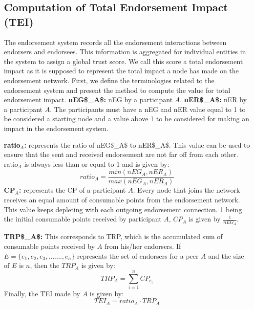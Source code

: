 \subsection{Computation of Total Endorsement Impact (TEI)} \label{computetei}
The endorsement system records all the endorsement interactions between
endorsers and endorsees. This information is aggregated for individual entities
in the system to assign a global trust score. We call this score a total
endorsement impact as it is supposed to represent the total impact a node has
made on the endorsement network. First, we define the terminologies related to
the endorsement system and present the method to compute the value for total
endorsement impact.\newline 
\textbf{{\acrshort{nEG$_A$:}}} \ac{nEG} by a participant $A$. \newline
\textbf{{\acrshort{nER$_A$:}}} \ac{nER} by a participant $A$. \newline
The participants must have a \ac{nEG} and \ac{nER} value equal to 1 to be
considered a starting node and a value above 1 to be considered for making an
impact in the endorsement system. \newline

\textbf{ratio$_A$:} represents the ratio of \acrshort{nEG$_A$} to
\acrshort{nER$_A$}. This value can be used to ensure that the sent and received
endorsement are not far off from each other. ratio$_{A}$ is always less than or
equal to 1 and is given by:   
\begin{equation}
	ratio_A = \frac{min(nEG_A, nER_A)}{max(nEG_A, nER_A)}
\end{equation}
\textbf{\acrshort{CP}$_A$:} represents the \ac{CP} of a participant $A$. Every
node that joins the network receives an equal amount of consumable points from
the endorsement network. This value keeps depleting with each outgoing
endorsement connection. 1 being the initial consumable points received by
participant $A$, $CP_{A}$ is given by $\frac{1}{nEG_A}$.\newline

\textbf{\acrshort{TRP$_A$}:} This corresponds to \ac{TRP}, which is the
accumulated sum of consumable points received by $A$ from his/her endorsers.
\newline
If $E = \{e_{1}, e_{2}, e_{3}, ......., e_{n}\}$ represents the set of
endorsers for a peer $A$ and the size of $E$ is $n$, then the $TRP_{A}$ is
given by:
\begin{equation}
	TRP_A = \sum_{i=1}^{n}CP_{e_{i}}
\end{equation}
Finally, the \ac{TEI} made by $A$ is given by: 
\begin{equation}
	TEI_A = ratio_A \cdot TRP_A
\end{equation}

